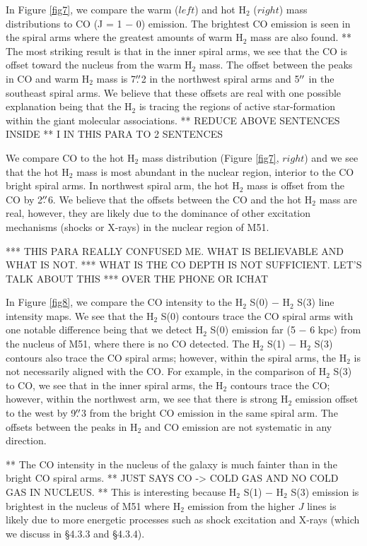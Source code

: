 \documentclass[manuscript]{aastex}
\begin{document}
In Figure \ref{fig7}, we compare the warm ($left$) and hot
$\mathrm{H_2}$ ($right$) mass distributions to CO (J = 1 $-$ 0)
emission.  The brightest CO emission is seen in the spiral arms where
the greatest amounts of warm $\mathrm{H_2}$ mass are also found.  ** The
most striking result is that in the inner spiral arms, we see that the
CO is offset toward the nucleus from the warm $\mathrm{H_2}$ mass.
The offset between the peaks in CO and warm $\mathrm{H_2}$ mass is
7$\mbox{$.\!\!^{\prime\prime}$}$2 in the northwest spiral arms and 5$\mbox{$^{\prime\prime}$}$ in the
southeast spiral arms.  We believe that these offsets are real with
one possible explanation being that the $\mathrm{H_2}$ is tracing the
regions of active star-formation within the giant molecular
associations. ** REDUCE ABOVE SENTENCES INSIDE ** I IN THIS PARA TO 2 SENTENCES

We compare CO to the hot $\mathrm{H_2}$ mass distribution (Figure
\ref{fig7}, $right$) and we see that the hot $\mathrm{H_2}$ mass is
most abundant in the nuclear region, interior to the CO bright spiral
arms.  In northwest spiral arm, the hot $\mathrm{H_2}$ mass is offset
from the CO by 2$\mbox{$.\!\!^{\prime\prime}$}$6. We believe that the offsets between the CO
and the hot $\mathrm{H_2}$ mass are real, however, they are likely due
to the dominance of other excitation mechanisms (shocks or X-rays) in
the nuclear region of M51.

*** THIS PARA REALLY CONFUSED ME.  WHAT IS BELIEVABLE AND WHAT IS NOT.
*** WHAT IS THE CO DEPTH IS NOT SUFFICIENT.  LET'S TALK ABOUT THIS
*** OVER THE PHONE OR ICHAT

In Figure \ref{fig8}, we compare the CO intensity to the
$\mathrm{H_2}$ S(0) $-$ $\mathrm{H_2}$ S(3) line intensity maps.  We
see that the $\mathrm{H_2}$ S(0) contours trace the CO spiral arms
with one notable difference being that we detect $\mathrm{H_2}$ S(0)
emission far (5 $-$ 6 kpc) from the nucleus of M51, where there is no
CO detected.  The $\mathrm{H_2}$ S(1) $-$ $\mathrm{H_2}$ S(3) contours
also trace the CO spiral arms; however, within the spiral arms, the
$\mathrm{H_2}$ is not necessarily aligned with the CO.  For example,
in the comparison of $\mathrm{H_2}$ S(3) to CO, we see that in the
inner spiral arms, the $\mathrm{H_2}$ contours trace the CO; however,
within the northwest arm, we see that there is strong $\mathrm{H_2}$
emission offset to the west by 9$\mbox{$.\!\!^{\prime\prime}$}$3 from the bright CO emission
in the same spiral arm.  The offsets between the peaks in
$\mathrm{H_2}$ and CO emission are not systematic in any direction.

** The CO intensity in the nucleus of the galaxy is much fainter than
in the bright CO spiral arms.  ** JUST SAYS CO -> COLD GAS AND NO COLD
GAS IN NUCLEUS. **  This is interesting because $\mathrm{H_2}$ S(1) $-$
$\mathrm{H_2}$ S(3) emission is brightest in the nucleus of M51 where
$\mathrm{H_2}$ emission from the higher $J$ lines is likely due to
more energetic processes such as shock excitation and X-rays (which we
discuss in \S4.3.3 and \S 4.3.4).
\end{document}
